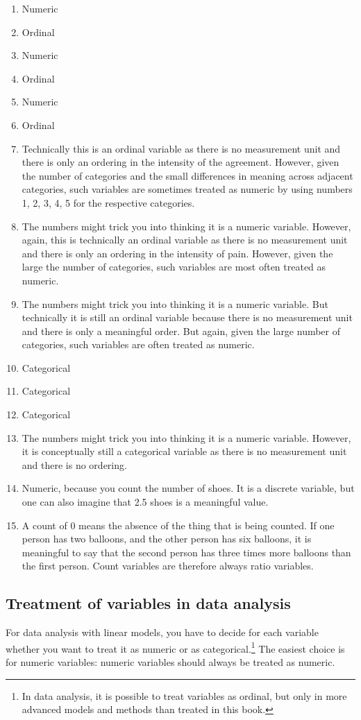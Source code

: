 \documentclass[]{book}\usepackage[]{graphicx}\usepackage[]{color}
\begin{document}
\begin{enumerate}
\item Numeric
\item Ordinal
\item Numeric
\item Ordinal
\item Numeric
\item Ordinal
\item Technically this is an ordinal variable as there is no measurement unit and there is only an ordering in the intensity of the agreement. However, given the number of categories and the small differences in meaning across adjacent categories, such variables are sometimes treated as numeric by using numbers 1, 2, 3, 4, 5 for the respective categories.
\item The numbers might trick you into thinking it is a numeric variable. However, again, this is technically an ordinal variable as there is no measurement unit and there is only an ordering in the intensity of pain. However, given the large the number of categories, such variables are most often treated as numeric.
\item The numbers might trick you into thinking it is a numeric variable. But technically it is still an ordinal variable because there is no measurement unit and there is only a meaningful order. But again, given the large number of categories, such variables are often treated as numeric.
\item Categorical
\item Categorical
\item Categorical
\item The numbers might trick you into thinking it is a numeric variable. However, it is conceptually still a categorical variable as there is no measurement unit and there is no ordering.
\item Numeric, because you count the number of shoes. It is a discrete variable, but one can also imagine that 2.5 shoes is a meaningful value.
\item A count of 0 means the absence of the thing that is being counted. If one person has two balloons, and the other person has six balloons, it is meaningful to say that the second person has three times more balloons than the first person. Count variables are therefore always ratio variables.
\end{enumerate}



\subsection{Treatment of variables in data analysis}
For data analysis with linear models, you have to decide for each variable whether you want to treat it as numeric or as categorical.\footnote{In data analysis, it is possible to treat variables as ordinal, but only in more advanced models and methods than treated in this book.} The easiest choice is for numeric variables: numeric variables should always be treated as numeric.
\end{document}
